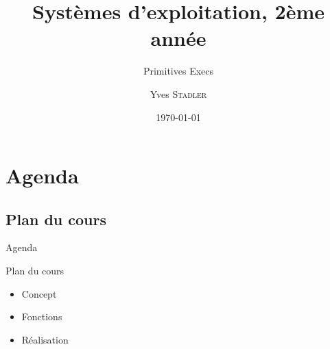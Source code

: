 
\title{Systèmes d'exploitation, 2ème année}
\subtitle{Primitives Execs}

\author{Yves \textsc{Stadler}}

\date{\today}




\begin{frame}
\titlepage
\end{frame}

\def\sectitle{Agenda}
\section{\sectitle}
\def\subsectitle{Plan du cours}
\subsection{\subsectitle}

\begin{frame}{\sectitle}
\begin{block}{\subsectitle}
\begin{itemize}
\item Concept
\item Fonctions
\item Réalisation
\end{itemize}
\end{block}
\end{frame}

\def\subsectitle{}
\subsection{\subsectitle}

\def\sectitle{Exec}
